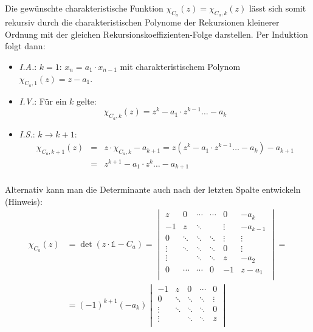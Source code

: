 \begin{flushenum}
	Die gewünschte charakteristische Funktion $\chi_{C_a}(z) =
	\chi_{C_a,k}(z)$ lässt sich somit rekursiv durch die charakteristischen
	Polynome der Rekursionen kleinerer Ordnung mit der gleichen
	Rekursionsko\-ef\-fi\-zien\-ten-Folge darstellen.  Per Induktion folgt
	dann:
	\begin{itemize}
		\item \textit{I.A.}: $k=1$: $x_{n} = a_1 \cdot x_{n-1}$ mit charakteristischem Polynom $\chi_{C_a, 1}(z) = z - a_1$.
		\item \textit{I.V.}: Für ein $k$ gelte:
				\[ \chi_{C_a, k}(z) = z^k - a_1 \cdot z^{k-1} \ldots - a_k \]
		\item \textit{I.S.}: $k \rightarrow k+1$:
				\begin{eqnarray*}
					\chi_{C_a,k+1}(z) &=& z \cdot \chi_{C_a,k} - a_{k+1} = z (z^k - a_1 \cdot z^{k-1} \ldots - a_k) - a_{k+1} \\
					&=& z^{k+1} - a_1 \cdot z^k \ldots - a_{k+1} \\
				\end{eqnarray*}
	\end{itemize}
	Alternativ kann man die Determinante auch nach der letzten Spalte entwickeln (Hinweis):
	\begin{align*}
	\chi_{C_a}(z) &= \det ( z\cdot \mathds{1} - C_a) = 
		\begin{vmatrix}
			z      & 0      & \cdots & \cdots & 0      & -a_k     \\
			-1     & z      & \ddots &        & \vdots & -a_{k-1} \\
			0      & \ddots & \ddots & \ddots & \vdots & \vdots   \\
			\vdots & \ddots & \ddots & \ddots & 0      & \vdots   \\
			\vdots &        & \ddots & \ddots & z      & -a_2     \\
			0      & \cdots & \cdots & 0      & -1     & z - a_1  \\
		\end{vmatrix} =  \\
	&= (-1)^{k+1}(-a_k) 	\begin{vmatrix}
					-1     & z      & 0      & \cdots & 0      \\
                                        0      & \ddots & \ddots & \ddots & \vdots \\
                                        \vdots & \ddots & \ddots & \ddots & 0      \\
                                        \vdots &        & \ddots & \ddots & z      \\

\end{vmatrix}
\end{align*}
\end{flushenum}
